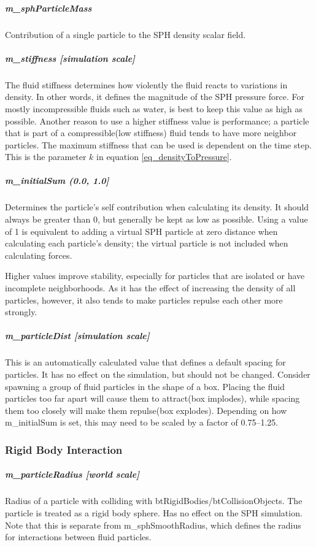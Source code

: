 \documentclass[]{article}
\begin{document}
			\subparagraph{m\_sphParticleMass}
				Contribution of a single particle to the SPH density scalar field.
				
			\subparagraph{m\_stiffness [simulation scale]}
				The fluid stiffness determines how violently the fluid reacts to variations in density. In other words, it
				defines the magnitude of the SPH pressure force. For mostly incompressible fluids such as water, is best to
				keep this value as high as possible. Another reason to use a higher stiffness value is performance; a particle
				that is part of a compressible(low stiffness) fluid tends to have more neighbor particles. The maximum stiffness
				that can be used is dependent on the time step.\\
				
				This is the parameter \(k\) in equation \ref{eq_densityToPressure}.
			
			\subparagraph{m\_initialSum (0.0, 1.0]}
				Determines the particle's self contribution when calculating its density. It should always be greater than 0,
				but generally be kept as low as possible. Using a value of 1 is equivalent to adding a virtual SPH particle at zero distance
				when calculating each particle's density; the virtual particle is not included when calculating forces.
				
				Higher values improve stability, especially for particles that are isolated or have incomplete neighborhoods. 
				As it has the effect of increasing the density of all particles, however, it also tends to make particles repulse
				each other more strongly.
				
			\subparagraph{m\_particleDist [simulation scale]}
				This is an automatically calculated value that defines a default spacing for particles. It has no effect on
				the simulation, but should not be changed. Consider spawning a group of fluid particles in the shape of a 
				box. Placing the fluid particles too far apart will cause them to attract(box implodes), while spacing them
				too closely will make them repulse(box explodes). Depending on how m\_initialSum is set, this may need to
				be scaled by a factor of 0.75--1.25.
		
		\subsubsection{Rigid Body Interaction}
			\subparagraph{m\_particleRadius [world scale]}
				Radius of a particle with colliding with btRigidBodies/btCollisionObjects. The particle is treated as a rigid body sphere.
				Has no effect on the SPH simulation. Note that this is separate from m\_sphSmoothRadius, which defines the radius for
				interactions between fluid particles.
				
\end{document}
